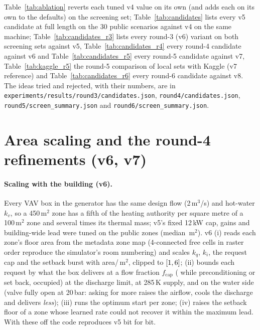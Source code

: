 \documentclass{article}
\begin{document}
Table~\ref{tab:ablation} reverts each tuned v4 value on its own (and adds each on its own to
the defaults) on the screening set; Table~\ref{tab:candidates} lists every v5 candidate at
full length on the 30 public scenarios against v4 on the same machine;
Table~\ref{tab:candidates_r3} lists every round-3 (v6) variant on both screening sets against
v5, Table~\ref{tab:candidates_r4} every round-4 candidate against v6 and Table~\ref{tab:candidates_r5}
every round-5 candidate against v7, Table~\ref{tab:kaggle_r5} the round-5 comparison of local sets with Kaggle
(v7 reference) and Table~\ref{tab:candidates_r6} every round-6 candidate against v8. The ideas tried and rejected,
with their numbers, are in \texttt{experiments/results/round3/candidates.json}, \texttt{round4/candidates.json},
\texttt{round5/screen\_summary.json} and \texttt{round6/screen\_summary.json}.







\section{Area scaling and the round-4 refinements (v6, v7)}
\label{app:versions}

\paragraph{Scaling with the building (v6).}
Every VAV box in the generator has the same design flow (2\,m$^3$/s) and hot-water $k_v$, so
a 450\,m$^2$ zone has a fifth of the heating authority per square metre of a 100\,m$^2$ zone
and several times its thermal mass; v5's fixed 12\,kW cap, gains and building-wide lead were
tuned on the public zones (median \PubZoneAreaMedian\,m$^2$). v6 (i) reads each zone's floor
area from the metadata zone map (4-connected free cells in raster order reproduce the
simulator's room numbering) and scales $k_q$, $k_i$, the request cap and the setback burst with
area/\ParAreaRef\,m$^2$, clipped to $[1, 6]$; (ii) bounds each
request by what the box delivers at a flow fraction $f_{\text{cap}}$ (\VSixFCapPre{} while
preconditioning or set back, \ParFCapOcc{} occupied) at the discharge limit, at 285\,K supply,
and on the water side (valve fully open at 20\,bar: asking for more raises the airflow, cools
the discharge and delivers \emph{less}); (iii) runs the optimum start per zone; (iv) raises the
setback floor of a zone whose learned rate could not recover it within the maximum lead. With
these off the code reproduces v5 bit for bit.
\end{document}
